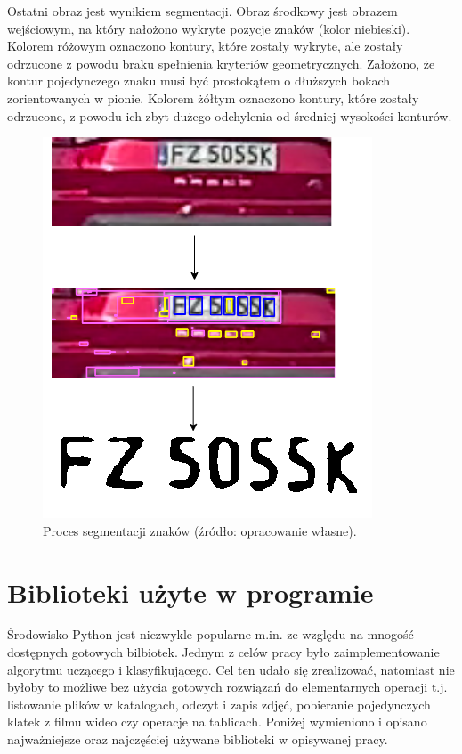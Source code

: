 Ostatni obraz jest wynikiem segmentacji.
Obraz środkowy jest obrazem wejściowym, na który nałożono wykryte pozycje znaków (kolor niebieski).
Kolorem różowym oznaczono kontury, które zostały wykryte, ale zostały odrzucone z powodu braku spełnienia kryteriów geometrycznych.
Założono, że kontur pojedynczego znaku musi być prostokątem o dłuższych bokach zorientowanych w pionie.
Kolorem żółtym oznaczono kontury, które zostały odrzucone, z powodu ich zbyt dużego odchylenia od średniej wysokości konturów.
\begin{figure}[!ht]
    \centering
    \includegraphics[scale=0.4]{Pictures/segmentation}
    \caption{Proces segmentacji znaków (źródło: opracowanie własne).}
    \label{fig:segmentation}
\end{figure}
\FloatBarrier


\section{Biblioteki użyte w programie}
Środowisko Python jest niezwykle popularne m.in. ze względu na mnogość dostępnych gotowych bilbiotek.
Jednym z celów pracy było zaimplementowanie algorytmu uczącego i klasyfikującego.
Cel ten udało się zrealizować, natomiast nie byłoby to możliwe bez użycia gotowych rozwiązań do elementarnych operacji t.j. listowanie plików w katalogach, odczyt i zapis zdjęć, pobieranie pojedynczych klatek z filmu wideo czy operacje na tablicach.
Poniżej wymieniono i opisano najważniejsze oraz najczęściej używane biblioteki w opisywanej pracy.

